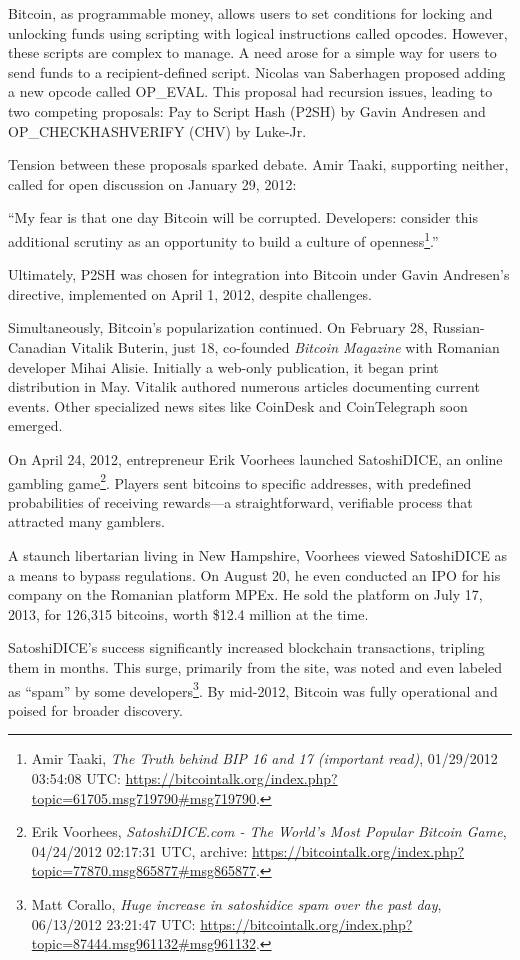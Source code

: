\documentclass[
  a5paper,
  smalldemyvopaper,10pt,twoside,onecolumn,openright,extrafontsizes,hidelinks]{memoir}
\begin{document}
Bitcoin, as programmable money, allows users to set conditions for
locking and unlocking funds using scripting with logical instructions
called opcodes. However, these scripts are complex to manage. A need
arose for a simple way for users to send funds to a recipient-defined
script. Nicolas van Saberhagen proposed adding a new opcode called
OP\_EVAL. This proposal had recursion issues, leading to two competing
proposals: Pay to Script Hash (P2SH) by Gavin Andresen and
OP\_CHECKHASHVERIFY (CHV) by Luke-Jr.

Tension between these proposals sparked debate. Amir Taaki, supporting
neither, called for open discussion on January 29, 2012:

``My fear is that one day Bitcoin will be corrupted. Developers:
consider this additional scrutiny as an opportunity to build a culture
of openness\footnote{Amir Taaki, \emph{The Truth behind BIP 16 and 17
  (important read)}, 01/29/2012 03:54:08 UTC:
  \url{https://bitcointalk.org/index.php?topic=61705.msg719790\#msg719790}.}.''

Ultimately, P2SH was chosen for integration into Bitcoin under Gavin
Andresen's directive, implemented on April 1, 2012, despite challenges.

Simultaneously, Bitcoin's popularization continued. On February 28,
Russian-Canadian Vitalik Buterin, just 18, co-founded \emph{Bitcoin
Magazine} with Romanian developer Mihai Alisie. Initially a web-only
publication, it began print distribution in May. Vitalik authored
numerous articles documenting current events. Other specialized news
sites like CoinDesk and CoinTelegraph soon emerged.

On April 24, 2012, entrepreneur Erik Voorhees launched SatoshiDICE, an
online gambling game\footnote{Erik Voorhees, \emph{SatoshiDICE.com - The
  World's Most Popular Bitcoin Game}, 04/24/2012 02:17:31 UTC, archive:
  \url{https://bitcointalk.org/index.php?topic=77870.msg865877\#msg865877}.}.
Players sent bitcoins to specific addresses, with predefined
probabilities of receiving rewards---a straightforward, verifiable
process that attracted many gamblers.

A staunch libertarian living in New Hampshire, Voorhees viewed
SatoshiDICE as a means to bypass regulations. On August 20, he even
conducted an IPO for his company on the Romanian platform MPEx. He sold
the platform on July 17, 2013, for 126,315 bitcoins, worth \$12.4
million at the time.

SatoshiDICE's success significantly increased blockchain transactions,
tripling them in months. This surge, primarily from the site, was noted
and even labeled as ``spam'' by some developers\footnote{Matt Corallo,
  \emph{Huge increase in satoshidice spam over the past day}, 06/13/2012
  23:21:47 UTC:
  \url{https://bitcointalk.org/index.php?topic=87444.msg961132\#msg961132}.}.
By mid-2012, Bitcoin was fully operational and poised for broader
discovery.
\end{document}
